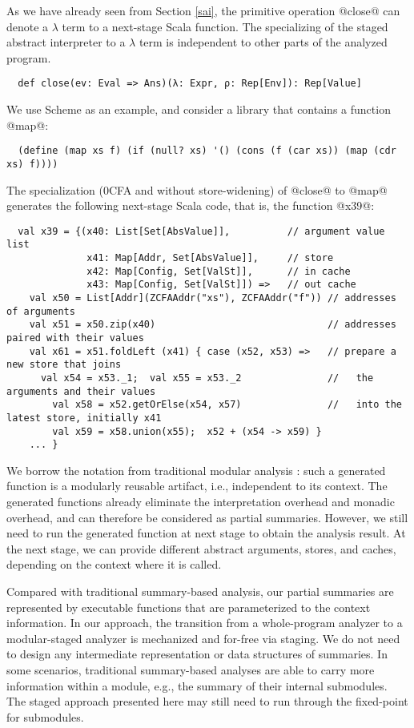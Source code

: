 As we have already seen from Section \ref{sai}, the primitive
operation @close@ can denote a $\lambda$ term to a next-stage Scala function.
The specializing of the staged abstract interpreter to a $\lambda$ term is
independent to other parts of the analyzed program.
\begin{lstlisting}
  def close(ev: Eval => Ans)(λ: Expr, ρ: Rep[Env]): Rep[Value]
\end{lstlisting}

We use Scheme as an example, and consider a library that contains a
function @map@:
\begin{lstlisting}
  (define (map xs f) (if (null? xs) '() (cons (f (car xs)) (map (cdr xs) f))))
\end{lstlisting}

The specialization (0CFA and without store-widening) of @close@ to
@map@ generates the following next-stage Scala code, that is, the
function @x39@:
\begin{lstlisting}
  val x39 = {(x40: List[Set[AbsValue]],          // argument value list
              x41: Map[Addr, Set[AbsValue]],     // store
              x42: Map[Config, Set[ValSt]],      // in cache
              x43: Map[Config, Set[ValSt]]) =>   // out cache
    val x50 = List[Addr](ZCFAAddr("xs"), ZCFAAddr("f")) // addresses of arguments
    val x51 = x50.zip(x40)                              // addresses paired with their values
    val x61 = x51.foldLeft (x41) { case (x52, x53) =>   // prepare a new store that joins
      val x54 = x53._1;  val x55 = x53._2               //   the arguments and their values
        val x58 = x52.getOrElse(x54, x57)               //   into the latest store, initially x41
        val x59 = x58.union(x55);  x52 + (x54 -> x59) }
    ... }
\end{lstlisting}

We borrow the notation from traditional modular analysis
\cite{DBLP:conf/cc/CousotC02}: such a generated function is a modularly reusable
artifact, i.e., independent to its context.
The generated functions already eliminate the interpretation overhead and
monadic overhead, and can therefore be considered as partial summaries. However, we
still need to run the generated function at next stage to obtain the analysis
result.  At the next stage, we can provide different abstract arguments, stores, and
caches, depending on the context where it is called.

Compared with traditional summary-based analysis, our partial
summaries are represented by executable functions that are
parameterized to the context information. In our approach, the
transition from a whole-program analyzer to a modular-staged analyzer is
mechanized and for-free via staging. We do not need to design any
intermediate representation or data structures of summaries.  In some
scenarios, traditional summary-based analyses are able to carry more
information within a module, e.g., the summary of their internal
submodules. The staged approach presented here may still need to run
through the fixed-point for submodules.

